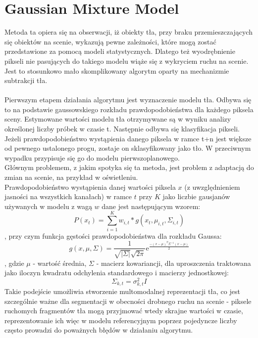\section{Gaussian Mixture Model}
\label{sec:GMM}
Metoda ta \cite{zivkovic2004improved} opiera się na obserwacji, iż obiekty tła, przy braku przemieszczających się obiektów na scenie, wykazują pewne zależności, które mogą zostać przedstawione za pomocą modeli statystycznych. Dlatego też wyodrębnienie pikseli nie pasujących do takiego modelu wiąże się z wykryciem ruchu na scenie. Jest to stosunkowo mało skomplikowany algorytm oparty na mechanizmie subtrakcji tła.
\paragraph{}
Pierwszym etapem działania algorytmu jest wyznaczenie modelu tła. Odbywa się to na podstawie gaussowskiego rozkładu prawdopodobieństwa dla każdego piksela sceny. Estymowane wartości modelu tła otrzymywane są w wyniku analizy określonej liczby próbek w czasie t. Następnie odbywa się klasyfikacja pikseli. Jeżeli prawdopodobieństwo wystąpienia danego piksela w ramce t+n jest większe od pewnego ustalonego progu, zostaje on sklasyfikowany jako tło. W przeciwnym wypadku przypisuje się go do modelu pierwszoplanowego.\\
Głównym problemem, z jakim spotyka się ta metoda, jest problem z adaptacją do zmian na scenie, na przykład w oświetleniu.\\
Prawdopodobieństwo wystąpienia danej wartości piksela $x$ (z uwzględnieniem jasności na wszystkich kanałach) w ramce $t$ przy $K$ jako liczbie gausjanów używanych w modelu z wagą $w$ dane jest następującym wzorem:
\begin{equation}
P(x_{t}) = \sum_{i=1}^{K} w_{i,t}*g(x_{t},\mu_{i,t},\Sigma_{i,t})
\end{equation}
, przy czym funkcja gęstości prawdopodobieństwa dla rozkładu Gaussa:
\begin{equation}
g(x,\mu,\Sigma) = \frac{1}{\sqrt{|\Sigma|}\sqrt{2\pi}}\mathrm{e}^\frac{-(x-\mu)^T\Sigma^{-1}(x-\mu)}{2}
\end{equation}
, gdzie $\mu$ - wartość średnia, $\Sigma$ - macierz kowariancji, dla uproszczenia traktowana jako iloczyn kwadratu odchylenia standardowego i macierzy jednostkowej:
\begin{equation}
\Sigma_{k,t}=\sigma_{k,t}^2I
\end{equation}
Takie podejście umożliwia stworzenie multomodalnej reprezentacji tła, co jest szczególnie ważne dla segmentacji w obecności drobnego ruchu na scenie - piksele ruchomych fragmentów tła mogą przyjmować wtedy skrajne wartości w czasie, reprezentowanie ich więc w modelu referencyjnym poprzez pojedyncze liczby często prowadzi do poważnych błędów w działaniu algorytmu. \\ 
